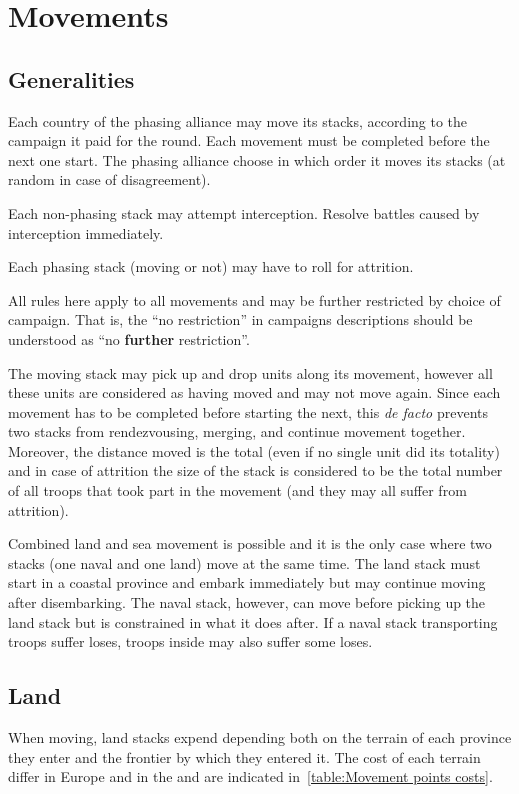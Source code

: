 \section{Movements}
\label{chMilitary:Movements}
\subsection{Generalities}
Each country of the phasing alliance may move its stacks, according to the
campaign it paid for the round. Each movement must be completed before the
next one start. The phasing alliance choose in which order it moves its stacks
(at random in case of disagreement).

Each non-phasing stack may attempt interception. Resolve battles caused by
interception immediately.

Each phasing stack (moving or not) may have to roll for attrition.

All rules here apply to all movements and may be further restricted by choice
of campaign. That is, the ``no restriction'' in campaigns descriptions should
be understood as ``no \textbf{further} restriction''.

The moving stack may pick up and drop units along its movement, however all
these units are considered as having moved and may not move again. Since each
movement has to be completed before starting the next, this \emph{de facto}
prevents two stacks from rendezvousing, merging, and continue movement
together. Moreover, the distance moved is the total (even if no single unit
did its totality) and in case of attrition the size of the stack is considered
to be the total number of all troops that took part in the movement (and they
may all suffer from attrition).

Combined land and sea movement is possible and it is the only case where two
stacks (one naval and one land) move at the same time. The land stack must
start in a coastal province and embark immediately but may continue moving
after disembarking. The naval stack, however, can move before picking up the
land stack but is constrained in what it does after. If a naval stack
transporting troops suffer loses, troops inside may also suffer some loses.

\subsection{Land}
When moving, land stacks expend \MP depending both on the terrain of each
province they enter and the frontier by which they entered it. The cost of
each terrain differ in Europe and in the \ROTW and are indicated
in~\ref{table:Movement points costs}.

